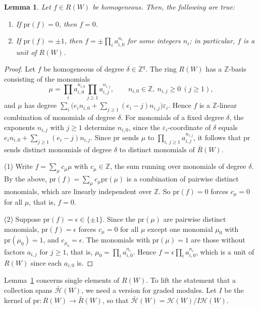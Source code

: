 \documentclass[11pt, reqno]{amsart}
\numberwithin{equation}{section}
\newtheorem{lemma}[theorem]{Lemma}
\theoremstyle{remark}
\begin{document}
\begin{lemma}\label{liftlem}
	Let $f\in R(W)$ be homogeneous. Then, the following are true:
	\begin{enumerate}
		\item If $\mathrm{pr}(f)=0$, then $f=0$. \smallbreak
		\item  If $\mathrm{pr}(f)=\pm1$, then
		$f=\pm\prod_ia_{i,0}^{n_i}$ for some integers $n_i$; in particular, $f$ is a unit of $R(W)$.
	\end{enumerate} 
\end{lemma}
\begin{proof}
	Let $f$ be homogeneous of degree $\delta\in\mathbb Z^q$. The ring $R(W)$ has a $\mathbb Z$-basis consisting of the
	monomials
	\[
	\mu=\prod_ia_{i,0}^{n_{i,0}}\prod_{j\geq1}a_{i,j}^{n_{i,j}},\qquad n_{i,0}\in\mathbb Z,\ n_{i,j}\geq0\ (j\geq1),
	\]
	and $\mu$ has degree $\sum_i\bigl(e_in_{i,0}+\sum_{j\geq1}(e_i-j)n_{i,j}\bigr)\varepsilon_i$. Hence $f$ is a
	$\mathbb Z$-linear combination of monomials of degree $\delta$. For monomials of a fixed degree $\delta$, the
	exponents $n_{i,j}$ with $j\geq1$ determine $n_{i,0}$, since the $\varepsilon_i$-coordinate of $\delta$ equals
	$e_in_{i,0}+\sum_{j\geq1}(e_i-j)n_{i,j}$. Since $\mathrm{pr}$ sends $\mu$ to $\prod_{i,\,j\geq1}a_{i,j}^{n_{i,j}}$,
	it follows that $\mathrm{pr}$ sends distinct monomials of degree $\delta$ to distinct monomials of $\bar R(W)$.
	
	(1) Write $f=\sum_\mu c_\mu\mu$ with $c_\mu\in\mathbb Z$, the sum running over monomials of degree $\delta$. By the
	above, $\mathrm{pr}(f)=\sum_\mu c_\mu\mathrm{pr}(\mu)$ is a combination of pairwise distinct monomials, which are linearly
	independent over $\mathbb Z$. So $\mathrm{pr}(f)=0$ forces $c_\mu=0$ for all $\mu$, that is, $f=0$.
	
	(2) Suppose $\mathrm{pr}(f)=\epsilon\in\{\pm1\}$. Since the $\mathrm{pr}(\mu)$ are pairwise distinct monomials, $\mathrm{pr}(f)=\epsilon$
	forces $c_\mu=0$ for all $\mu$ except one monomial $\mu_0$ with $\mathrm{pr}(\mu_0)=1$, and $c_{\mu_0}=\epsilon$. The
	monomials with $\mathrm{pr}(\mu)=1$ are those without factors $a_{i,j}$ for $j\geq1$, that is,
	$\mu_0=\prod_ia_{i,0}^{n_i}$. Hence $f=\epsilon\prod_ia_{i,0}^{n_i}$, which is a unit of $R(W)$ since each
	$a_{i,0}$ is.
	\end{proof}
	
Lemma~\ref{liftlem} concerns single elements of $R(W)$. To lift the
statement that a collection spans $\bar{\mathcal H}(W)$, we need a
version for graded modules. Let $I$ be the kernel of
$\mathrm{pr}\colon R(W)\to\bar R(W)$, so that
$\bar{\mathcal H}(W)=\mathcal H(W)/I\mathcal H(W)$.
\end{document}
